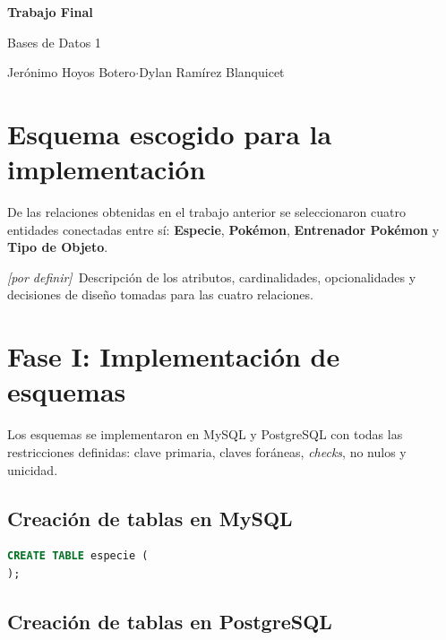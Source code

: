 \documentclass[11pt,a4paper]{article}
\newcommand{\pordefinir}{\textit{\color{gris}[por definir]}}
\newcommand{\sep}{\hspace{0.5em}\textcolor{grisclaro}{$\cdot$}\hspace{0.5em}}
\begin{document}
\begin{center}
  {\huge\bfseries Trabajo Final}

  \vspace{7pt}

  {\large\color{gris}Bases de Datos 1}

  \vspace{16pt}

  Jerónimo Hoyos Botero\sep Dylan Ramírez Blanquicet
\end{center}

\vspace{1.1cm}

\tableofcontents
\thispagestyle{empty}

\newpage

\section{Esquema escogido para la implementación}
\label{sec:esquema}

De las relaciones obtenidas en el trabajo anterior se seleccionaron cuatro entidades
conectadas entre sí: \textbf{Especie}, \textbf{Pokémon}, \textbf{Entrenador Pokémon}
y \textbf{Tipo de Objeto}.

\pordefinir\ Descripción de los atributos, cardinalidades, opcionalidades y decisiones
de diseño tomadas para las cuatro relaciones.

\section{Fase I: Implementación de esquemas}
\label{sec:fase1}

Los esquemas se implementaron en MySQL y PostgreSQL con todas las restricciones
definidas: clave primaria, claves foráneas, \textit{checks}, no nulos y unicidad.

\subsection{Creación de tablas en MySQL}

\begin{lstlisting}[language=SQL,caption={Definición del esquema en MySQL.},label={lst:mysql}]
CREATE TABLE especie (
);
\end{lstlisting}

\subsection{Creación de tablas en PostgreSQL}
\end{document}
